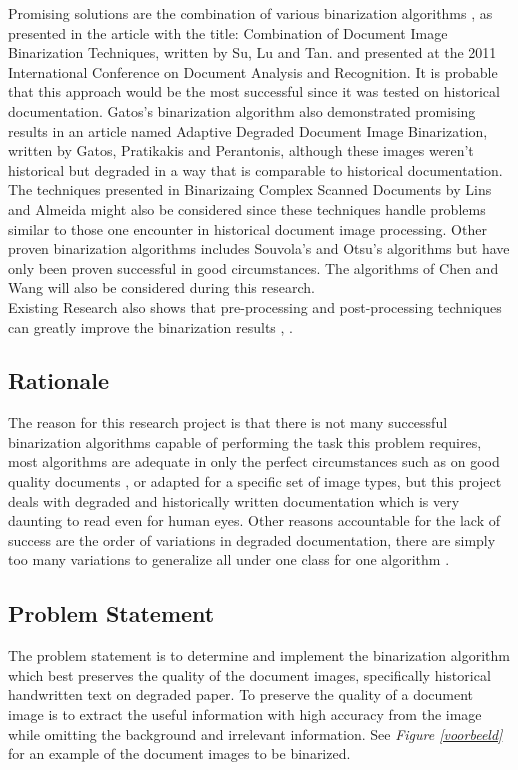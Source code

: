 \documentclass[11pt]{article}
\begin{document}
    		Promising solutions are the combination of various binarization algorithms \cite{su2011combination}, as presented in the article with the title: Combination of Document Image Binarization Techniques, written by Su, Lu and Tan. and presented at the 2011 International Conference on Document Analysis and Recognition. It is probable that this approach would be the most successful since it was tested on historical documentation. Gatos's binarization algorithm also demonstrated promising results in an article named Adaptive Degraded Document Image Binarization, written by Gatos, Pratikakis and Perantonis\cite{gatos2006adaptive}, although these images weren't historical but degraded in a way that is comparable to historical documentation. The techniques presented in Binarizaing Complex Scanned Documents by Lins and Almeida \cite{lins2015binarizing} might also be considered since these techniques handle problems similar to those one encounter in historical document image processing. Other proven binarization algorithms includes Souvola's and Otsu's algorithms but have only been proven successful in good circumstances. The algorithms of Chen and Wang will also be considered during this research.\\

    		Existing Research also shows that pre-processing and post-processing techniques can greatly improve the binarization results \cite{jacob2014survey}, \cite{ntogas2008binarization}.

    \subsection{Rationale}
		The reason for this research project is that there is not many successful binarization algorithms capable of performing the task this problem requires, most algorithms are adequate in only the perfect circumstances such as on good quality documents \cite{jacob2014survey}, or adapted for a specific set of image types, but this project deals with degraded and historically written documentation which is very daunting to read even for human eyes. Other reasons accountable for the lack of success are the order of variations in degraded documentation, there are simply too many variations to generalize all under one class for one algorithm \cite{ntogas2008binarization}.

	\subsection{Problem Statement}
    		The problem statement is to determine and implement the binarization algorithm which best preserves the quality of the document images, specifically historical handwritten text on degraded paper. To preserve the quality of a document image is to extract the useful information with high accuracy from the image while omitting the background and irrelevant information. See \textit{Figure \ref{voorbeeld}} for an example of the document images to be binarized.
\end{document}
